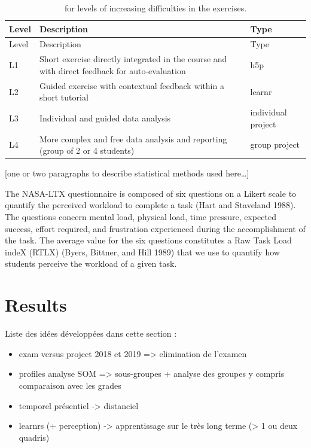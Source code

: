 \documentclass[
]{article}
\providecommand{\tightlist}{%
  \setlength{\itemsep}{0pt}\setlength{\parskip}{0pt}}
\begin{document}
\begin{longtable}[]{@{}
  >{\raggedright\arraybackslash}p{}
  >{\raggedright\arraybackslash}p{}
  >{\raggedright\arraybackslash}p{}@{}}
\caption{for levels of increasing difficulties in the
exercises.}\tabularnewline
\toprule
Level & Description & Type \\
\midrule
\endfirsthead
\toprule
Level & Description & Type \\
\midrule
\endhead
L1 & Short exercise directly integrated in the course and with direct
feedback for auto-evaluation & h5p \\
L2 & Guided exercise with contextual feedback within a short tutorial &
learnr \\
L3 & Individual and guided data analysis & individual project \\
L4 & More complex and free data analysis and reporting (group of 2 or 4
students) & group project \\
\bottomrule
\end{longtable}

{[}one or two paragraphs to describe statistical methods used
here\ldots{]}

The NASA-LTX questionnaire is composed of six questions on a Likert
scale to quantify the perceived workload to complete a task (Hart and
Staveland 1988). The questions concern mental load, physical load, time
pressure, expected success, effort required, and frustration experienced
during the accomplishment of the task. The average value for the six
questions constitutes a Raw Task Load indeX (RTLX) (Byers, Bittner, and
Hill 1989) that we use to quantify how students perceive the workload of
a given task.

\hypertarget{results}{%
\section{Results}\label{results}}

Liste des idées développées dans cette section :

\begin{itemize}
\tightlist
\item
  exam versus project 2018 et 2019 =\textgreater{} elimination de
  l'examen
\item
  profiles analyse SOM =\textgreater{} sous-groupes + analyse des
  groupes y compris comparaison avec les grades
\item
  temporel présentiel -\textgreater{} distanciel
\item
  learnrs (+ perception) -\textgreater{} apprentissage sur le très long
  terme (\textgreater{} 1 ou deux quadris)
\end{itemize}
\end{document}
